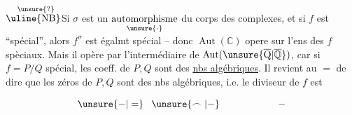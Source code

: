 \(\overset{\hspace{0.55em}\unsure{?}}{\text{\uline{NB}}}\)\quad Si $\sigma$ est un
\(\underset{\unsure{\cdot}}{\text{automorphisme}}\) du corps des complexes, et si $f$ est ``spécial'', alors $f^\sigma$ est égalmt spécial -- donc $\operatorname{Aut}(\mathbb C)$ opere sur l'ens des $f$ spèciaux. Mais il opère par l'intermédiaire de $\operatorname{Aut}(\unsure{\overline{\mathrm Q}|\overline{\mathbb Q}})$, car si $f=P/Q$ spécial, les coeff. de $P,Q$ sont des \uline{nbs algébriques}. Il revient au $=$ de dire que les zéros de $P,Q$ sont des nbs algébriques, i.e. le diviseur de $f$ est
\margin{\(\unsure{\cdot\,\cdot|-}\)}

\[
 \unsure{-|=}\hspace{0.8em}\unsure{\frown|-}\hspace{6em}-
\]

